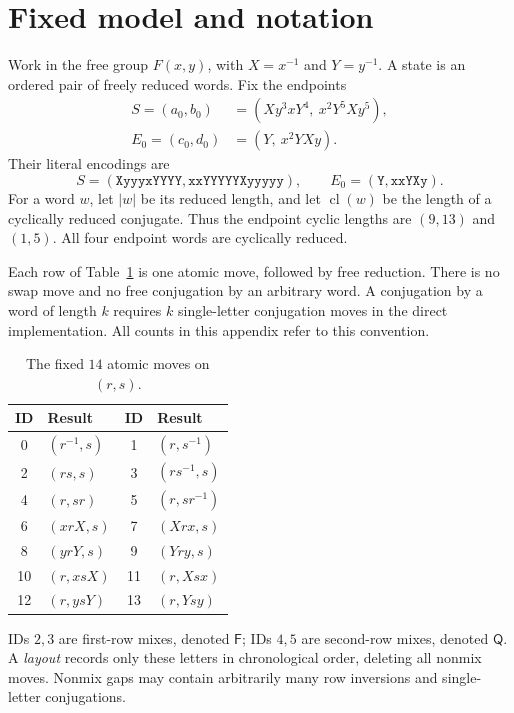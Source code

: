 \documentclass[11pt,a4paper]{article}
\theoremstyle{definition}\newtheorem{definition}[theorem]{Definition}
\theoremstyle{remark}\newtheorem{remark}[theorem]{Remark}
\newcommand{\cl}{\operatorname{cl}}
\newcommand{\F}{\mathsf F}
\newcommand{\Q}{\mathsf Q}
\newcommand{\word}[1]{\texttt{#1}}
\begin{document}
\newpage
\begingroup\small\setlength{\parskip}{0pt}\tableofcontents\endgroup
\newpage
\section{Fixed model and notation}\label{sec:model}
Work in the free group $F(x,y)$, with $X=x^{-1}$ and $Y=y^{-1}$. A state is an ordered pair of freely reduced words. Fix the endpoints
\begin{align*}
 S=(a_0,b_0)&=(Xy^3xY^4,\ x^2Y^5Xy^5),\\
 E_0=(c_0,d_0)&=(Y,\ x^2YXy).
\end{align*}
Their literal encodings are
\[
S=(\word{XyyyxYYYY},\word{xxYYYYYXyyyyy}),\qquad
E_0=(\word{Y},\word{xxYXy}).
\]
For a word $w$, let $|w|$ be its reduced length, and let $\cl(w)$ be the length of a cyclically reduced conjugate. Thus the endpoint cyclic lengths are $(9,13)$ and $(1,5)$. All four endpoint words are cyclically reduced.

Each row of Table~\ref{tab:moves} is one atomic move, followed by free reduction. There is no swap move and no free conjugation by an arbitrary word. A conjugation by a word of length $k$ requires $k$ single-letter conjugation moves in the direct implementation. All counts in this appendix refer to this convention.

\begin{table}[H]\centering
\caption{The fixed $14$ atomic moves on $(r,s)$.}\label{tab:moves}
\begin{tabular}{clcl}\toprule
ID & Result & ID & Result\\\midrule
0 & $(r^{-1},s)$ & 1 & $(r,s^{-1})$\\
2 & $(rs,s)$ & 3 & $(rs^{-1},s)$\\
4 & $(r,sr)$ & 5 & $(r,sr^{-1})$\\
6 & $(xrX,s)$ & 7 & $(Xrx,s)$\\
8 & $(yrY,s)$ & 9 & $(Yry,s)$\\
10 & $(r,xsX)$ & 11 & $(r,Xsx)$\\
12 & $(r,ysY)$ & 13 & $(r,Ysy)$\\\bottomrule
\end{tabular}
\end{table}

IDs $2,3$ are first-row mixes, denoted $\F$; IDs $4,5$ are second-row mixes, denoted $\Q$. A \emph{layout} records only these letters in chronological order, deleting all nonmix moves. Nonmix gaps may contain arbitrarily many row inversions and single-letter conjugations.
\end{document}
